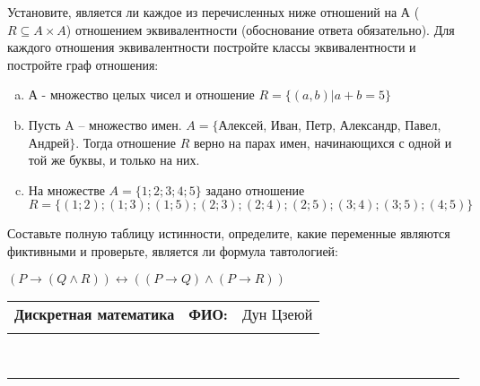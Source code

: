 \documentclass[10pt]{exam}
\newcommand{\class}{Дискретная математика}
\newcommand{\examdate}{}
\begin{document}
\begin{questions}
\question
Установите, является ли каждое из перечисленных ниже отношений на А ($R \subseteq A \times A$) отношением эквивалентности (обоснование ответа обязательно). Для каждого отношения эквивалентности постройте классы 
эквивалентности и постройте граф отношения:
\begin{enumerate} [a)]\setcounter{enumi}{0}
\item А - множество целых чисел и отношение $R = \{(a,b)|a + b = 5\}$
\item Пусть A – множество имен. $A = \{ $Алексей, Иван, Петр, Александр, Павел, Андрей$ \}$. Тогда отношение $R $ верно на парах имен, начинающихся с одной и той же буквы, и только на них.
\item На множестве $A = \{1; 2; 3; 4; 5\}$ задано отношение $R = \{(1; 2); (1; 3); (1; 5); (2; 3); (2; 4); (2; 5); (3; 4); (3; 5); (4; 5)\}$
\end{enumerate}\question Составьте полную таблицу истинности, определите, какие переменные являются фиктивными и проверьте, является ли формула тавтологией:

$(P \rightarrow (Q \land R)) \leftrightarrow ((P \rightarrow Q) \land (P \rightarrow R))$

\end{questions}
\newpage
\begin{flushright}
\begin{tabular}{p{2.8in} r l}
\textbf{\class} & \textbf{ФИО:} &Дун Цзеюй
\\

\textbf{\examdate} &&\\
\end{tabular}\\
\end{flushright}
\rule[1ex]{\textwidth}{.1pt}
\end{document}
